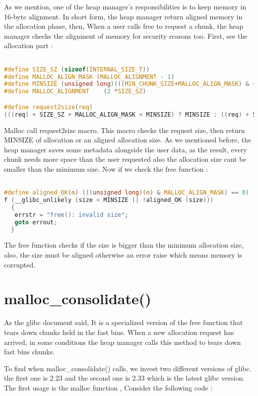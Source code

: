 \documentclass{masterthesis}
\newcommand*\libc{glibc}
\newcommand*\fb{fast bins}
\begin{document}
As we mention, one of the heap manager's responsibilities is to keep memory in 16-byte alignment. In short form, the heap manager return aligned memory in the allocation phase, then, When a user calls free to request a chunk, the heap manager checks the alignment of memory for security reasons too. First, see the allocation part :
\begin{lstlisting}[language=c,frame=tlrb]

#define SIZE_SZ (sizeof(INTERNAL_SIZE_T))
#define MALLOC_ALIGN_MASK (MALLOC_ALIGNMENT - 1)
#define MINSIZE (unsigned long)(((MIN_CHUNK_SIZE+MALLOC_ALIGN_MASK) & ~MALLOC_ALIGN_MASK))
#define MALLOC_ALIGNMENT    (2 *SIZE_SZ)

#define request2size(req)
(((req) + SIZE_SZ + MALLOC_ALIGN_MASK < MINSIZE) ? MINSIZE : ((req) + SIZE_SZ + MALLOC_ALIGN_MASK) & ~MALLOC_ALIGN_MASK)
\end{lstlisting}
Malloc call request2size macro. This macro checks the request size, then return MINSIZE of allocation or an aligned allocation size. As we mentioned before, the heap manager saves some metadata alongside the user data, as the result, every chunk needs more space than the user requested also the allocation size cant be smaller than the minimum size. Now if we check the free function :

\begin{lstlisting}[language=c,frame=tlrb]

#define aligned_OK(m) (((unsigned long)(m) & MALLOC_ALIGN_MASK) == 0)
f (__glibc_unlikely (size < MINSIZE || !aligned_OK (size)))
  {
   errstr = "free(): invalid size";
   goto errout;
  }
\end{lstlisting}
The free function checks if the size is bigger than the minimum allocation size, also, the size must be aligned otherwise an error raise which means memory is corrupted.

\section{malloc\_consolidate()}
As the \libc{} document said, It is a specialized version of the free function that tears down chunks held in the \fb{}. When a new allocation request has arrived, in some conditions the heap manager calls this method to tears down \fb{} chunks. 

To find when malloc\_consolidate() calls, we invest two different versions of \libc{}. the first one is 2.23 and the second one is 2.33 which is the latest \libc{} version. The first usage is the malloc function , Consider the following code :
\end{document}
